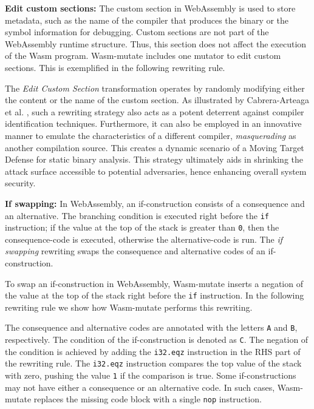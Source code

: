\documentclass[sigplan,screen]{acmart}
\newcommand{\tool}{Wasm-mutate\xspace}
\begin{document}
\textbf{Edit custom sections:}
The custom section in WebAssembly is used to store metadata, such as the name of the compiler that produces the binary or the symbol information for debugging.
Custom sections are not part of the WebAssembly runtime structure.
Thus, this section does not affect the execution of the Wasm program.
\tool includes one mutator to edit custom sections. 
This is exemplified in the following rewriting rule. 



The \emph{Edit Custom Section} transformation operates by randomly modifying either the content or the name of the custom section. 
As illustrated by Cabrera-Arteaga et al. \cite{CABRERAARTEAGA2023103296}, such a rewriting strategy also acts as a potent deterrent against compiler identification techniques.
Furthermore, it can also be employed in an innovative manner to emulate the characteristics of a different compiler, \emph{masquerading} as another compilation source. 
This creates a dynamic scenario of a Moving Target Defense for static binary analysis. 
This strategy ultimately aids in shrinking the attack surface accessible to potential adversaries, hence enhancing overall system security.



\textbf{If swapping:} In WebAssembly, an if-construction consists of a consequence and an alternative. The branching condition is executed right before the \texttt{if} instruction; if the value at the top of the stack is greater than \texttt{0}, then the consequence-code is executed, otherwise the alternative-code is run.
The \emph{if swapping} rewriting swaps the consequence and alternative codes of an if-construction.


To swap an if-construction in WebAssembly, \tool inserts a negation of the value at the top of the stack right before the \texttt{if} instruction.
In the following rewriting rule we show how \tool performs this rewriting.

The consequence and alternative codes are annotated with the letters \texttt{A} and \texttt{B}, respectively.
The condition of the if-construction is denoted as \texttt{C}.
The negation of the condition is achieved by adding the \texttt{i32.eqz} instruction in the RHS part of the rewriting rule.
The \texttt{i32.eqz} instruction compares the top value of the stack with zero, pushing the value \texttt{1} if the comparison is true.
Some if-constructions may not have either a consequence or an alternative code.
In such cases, \tool replaces the missing code block with a single \texttt{nop} instruction.
\end{document}
